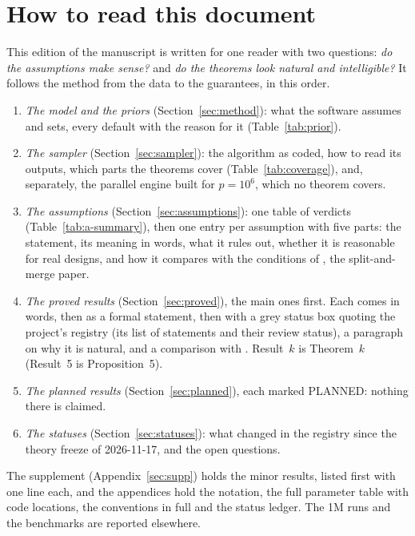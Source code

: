 \section{How to read this document}\label{sec:intro}

This edition of the manuscript is written for one reader with two questions: \emph{do the assumptions make sense?} and
\emph{do the theorems look natural and intelligible?} It follows the method from the data to the guarantees, in this
order.
\begin{enumerate}[leftmargin=1.6em,itemsep=1pt]
  \item \emph{The model and the priors} (Section~\ref{sec:method}): what the software assumes and sets, every default with
    the reason for it (Table~\ref{tab:prior}).
  \item \emph{The sampler} (Section~\ref{sec:sampler}): the algorithm as coded, how to read its outputs, which parts the
    theorems cover (Table~\ref{tab:coverage}), and, separately, the parallel engine built for $p=10^6$, which no theorem
    covers.
  \item \emph{The assumptions} (Section~\ref{sec:assumptions}): one table of verdicts (Table~\ref{tab:a-summary}), then one
    entry per assumption with five parts: the statement, its meaning in words, what it rules out, whether it is reasonable
    for real designs, and how it compares with the conditions of \citet{SongLiang2015}, the split-and-merge paper.
  \item \emph{The proved results} (Section~\ref{sec:proved}), the main ones first. Each comes in words, then as a formal
    statement, then with a grey status box quoting the project's registry (its list of statements and their review
    status), a paragraph on why it is natural, and a comparison with \citet{SongLiang2015}. Result~$k$ is Theorem~$k$
    (Result~5 is Proposition~5).
  \item \emph{The planned results} (Section~\ref{sec:planned}), each marked \textsf{PLANNED}: nothing there is claimed.
  \item \emph{The statuses} (Section~\ref{sec:statuses}): what changed in the registry since the theory freeze of
    2026-11-17, and the open questions.
\end{enumerate}
The supplement (Appendix~\ref{sec:supp}) holds the minor results, listed first with one line each, and the appendices hold
the notation, the full parameter table with code locations, the conventions in full and the status ledger. The 1M runs and
the benchmarks are reported elsewhere.

